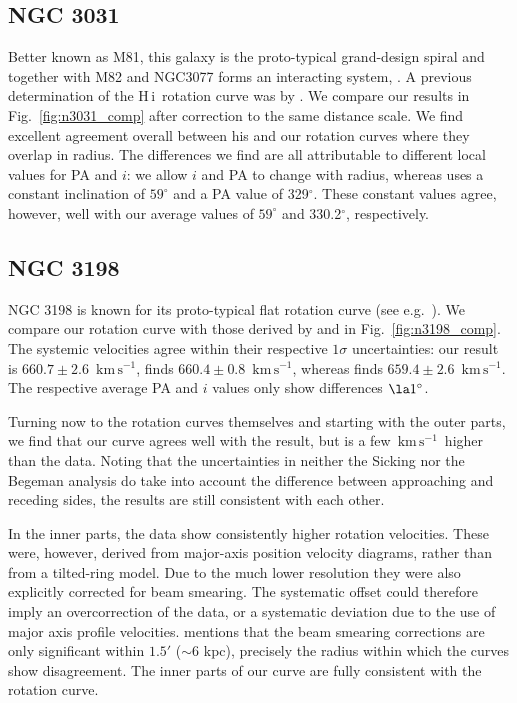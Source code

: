 \documentclass[usenatbib,usegraphicx,apjfonts,floatfix]{emulateapj}
\newcommand{\kms}{\ensuremath{\,\mbox{km}\,\mbox{s}^{-1}}}
\newcommand{\HI}{H\,{\sc i}}
\begin{document}
\subsection{NGC 3031}

Better known as M81, this galaxy is the proto-typical grand-design
spiral and together with M82 and NGC3077 forms an interacting system,
\citep[e.g.,][]{vdhulst1979,yun1994}.  A previous determination of the
\HI\ rotation curve was by \citet{visser78,visser80}.  We compare our
results in Fig.\ \ref{fig:n3031_comp} after correction to the same
distance scale. We find excellent agreement overall between his and
our rotation curves where they overlap in radius. The differences we
find are all attributable to different local values for PA and $i$: we
allow $i$ and PA to change with radius, whereas \citet{visser80} uses
a constant inclination of $59^{\circ}$ and a PA value of
329$^{\circ}$. These constant values agree, however, well with our
average values of $59^{\circ}$ and 330.2$^{\circ}$, respectively.

\subsection{NGC 3198}

NGC 3198 is known for its proto-typical flat rotation curve (see
e.g.\ \citealt{tjeerd85}).  We compare our rotation curve with those
derived by \citet{begeman87,begeman89} and \citet{sicking_phd} in
Fig.\ \ref{fig:n3198_comp}.  The systemic velocities agree within
their respective $1\sigma$ uncertainties: our result is $660.7 \pm
2.6$ \kms, \citet{begeman89} finds $660.4 \pm 0.8$ \kms, whereas
\citet{sicking_phd} finds $659.4 \pm 2.6$ \kms.  The respective
average PA and $i$ values only show differences $\la 1^{\circ}$.

Turning now to the rotation curves themselves and starting with the
outer parts, we find that our curve agrees well with the
\citet{sicking_phd} result, but is a few \kms\ higher than the
\citet{begeman89} data.  Noting that the uncertainties in neither the
Sicking nor the Begeman analysis do take into account the difference
between approaching and receding sides, the results are still
consistent with each other.

In the inner parts, the \citet{begeman89} data show consistently
higher rotation velocities.  These were, however, derived from
major-axis position velocity diagrams, rather than from a tilted-ring
model. Due to the much lower resolution they were also explicitly
corrected for beam smearing. The systematic offset could therefore
imply an overcorrection of the \citet{begeman89} data, or a systematic
deviation due to the use of major axis profile
velocities. \citet{begeman87} mentions that the beam smearing
corrections are only significant within $1.5'$ ($\sim 6$ kpc),
precisely the radius within which the curves show disagreement.  The
inner parts of our curve are fully consistent with the
\citet{sicking_phd} rotation curve.
\end{document}
